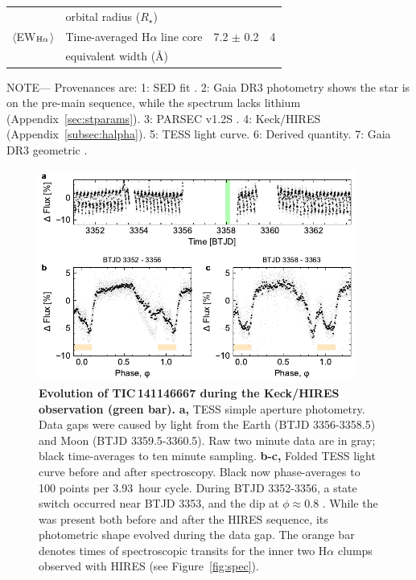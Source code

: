 \documentclass[11pt,twocolumn,tighten,linenumbers]{aastex7}
\begin{document}
\begin{table}
\begin{tabular}{llcc}
                                        & \hspace{3pt} orbital radius ($R_\star$)	                       &                      \\
%
$\langle$EW$_{\rm H\alpha}$$\rangle$    & Time-averaged H$\alpha$ line core                              &  7.2 $\pm$ 0.2   & 4 \\ 
                                        & \hspace{3pt} equivalent width (\AA)	                           &                      \\
\hline
\end{tabular}
\begin{flushleft}
\footnotesize{ \textsc{NOTE}---
Provenances are:
1: SED fit \citep{Bouma2024}.
2: Gaia DR3 photometry shows the star is on the pre-main sequence,
   while the spectrum lacks lithium (Appendix~\ref{sec:stparams}).
3: PARSEC v1.2S \citep{Chen2014}.
4: Keck/HIRES (Appendix~\ref{subsec:halpha}).
5: TESS light curve.
6: Derived quantity.
7: Gaia DR3 geometric \citep{GaiaDR3}.
}
\end{flushleft}
\vspace{-0.5cm}
\end{table}

\begin{figure}[!t]
  \centering
  \includegraphics[width=0.925\textwidth]{f2.pdf}
  \vspace{-0.2cm}
  \caption{{\bf Evolution of TIC\,141146667 during the Keck/HIRES
  observation (green bar).}  {\bf a,} TESS simple aperture photometry.
  Data gaps were caused by light from the Earth (BTJD 3356-3358.5) and
  Moon (BTJD 3359.5-3360.5).  Raw two minute data are in gray; black
  time-averages to ten minute sampling.  {\bf b-c,} Folded TESS light
  curve before and after spectroscopy.  Black now phase-averages to
  100 points per 3.93\ hour cycle.  During BTJD 3352-3356, a state
  switch occurred near BTJD 3353, and the dip at $\phi$$\approx$0.8
  .  While the  was present both before and after the HIRES
  sequence, its photometric shape evolved during the data gap.  The
  orange bar denotes times of spectroscopic transits for the inner two
  H$\alpha$ clumps observed with HIRES (see Figure~\ref{fig:spec}).}
  \label{fig:fulllc}
\end{figure}
\end{document}
